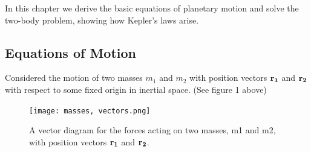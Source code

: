 In this chapter we derive the basic equations of planetary motion and solve the two-body problem, showing how Kepler’s laws arise.

\subsection{Equations of Motion}
Considered the motion of two masses $m_{1}$ and $m_{2}$ with position vectors $\bf{r_1}$ and $\bf{r_2}$ with respect to some fixed origin in inertial space. (See figure 1 above)

\begin{figure}
    \centering
    \texttt{[image: masses, vectors.png]}
    \caption{A vector diagram for the forces acting on two masses, m1 and m2, with position vectors $\bf{r_1}$ and $\bf{r_2}$.}
    \label{fig:masses vectors}
\end{figure}

